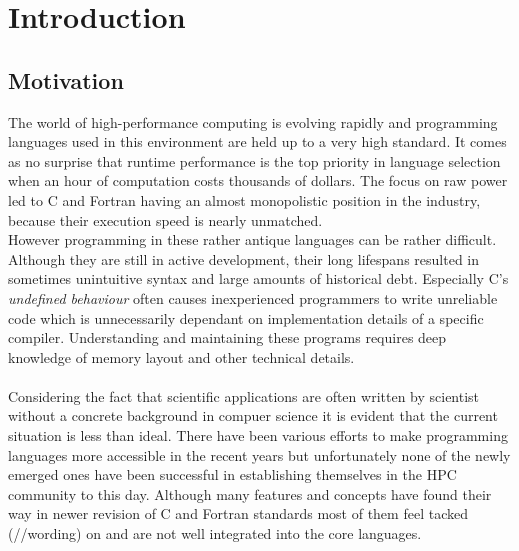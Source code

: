 \chapter{Introduction}
\label{chap:Introduction}


\section{Motivation}
\label{sec:Motivation}

The world of high-performance computing is evolving rapidly and programming languages used in this environment are held up to a very high standard. It comes as no surprise that runtime performance is the top priority in language selection when an hour of computation costs thousands of dollars. The focus on raw power led to C and Fortran having an almost monopolistic position in the industry, because their execution speed is nearly unmatched.
\\
However programming in these rather antique languages can be rather difficult. Although they are still in active development, their long lifespans resulted in sometimes unintuitive syntax and large amounts of historical debt. Especially C's \textit{undefined behaviour} often causes inexperienced programmers to write unreliable code which is unnecessarily dependant on implementation details of a specific compiler. Understanding and maintaining these programs requires deep knowledge of memory layout and other technical details.
\\ \\
Considering the fact that scientific applications are often written by scientist without a concrete background in compuer science it is evident that the current situation is less than ideal. There have been various efforts to make programming languages more accessible in the recent years but unfortunately none of the newly emerged ones have been successful in establishing themselves in the HPC community to this day. Although many features and concepts have found their way in newer revision of C and Fortran standards most of them feel tacked (//wording) on and are not well integrated into the core languages.
\\

